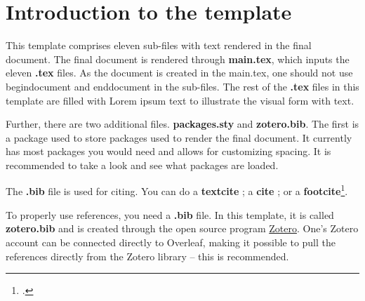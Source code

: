 \section{Introduction to the template}
This template comprises eleven sub-files with text rendered in the final document. The final document is rendered through \textbf{main.tex}, which inputs the eleven \textbf{.tex} files. As the document is created in the main.tex, one should not use begin{document} and end{document} in the sub-files. The rest of the \textbf{.tex} files in this template are filled with Lorem ipsum text to illustrate the visual form with text.

Further, there are two additional files. \textbf{packages.sty} and \textbf{zotero.bib}. The first is a package used to store packages used to render the final document. It currently has most packages you would need and allows for customizing spacing. It is recommended to take a look and see what packages are loaded.

The \textbf{.bib} file is used for citing. You can do a \textbf{textcite} \textcite{fischer_long-term_1977}; a \textbf{cite} \cite{calvo_staggered_1983}; or a \textbf{footcite}\footcite{taylor_staggered_1979}.

To properly use references, you need a \textbf{.bib} file. In this template, it is called \textbf{zotero.bib} and is created through the open source program \hyperlink{https://www.zotero.org/}{Zotero}. One's Zotero account can be connected directly to Overleaf, making it possible to pull the references directly from the Zotero library – this is recommended.



